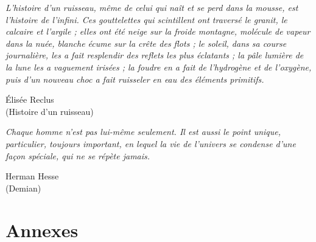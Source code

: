 \documentclass[a4paper,12pt,twoside]{StyleThese}
\begin{document}
\cleardoublepage
\vspace*{\fill} \epigraph{\itshape L’histoire d’un ruisseau, même de celui qui naît et se perd dans la mousse, est l’histoire de l’infini. Ces gouttelettes qui scintillent ont traversé le granit, le calcaire et l’argile ; elles ont été neige sur la froide montagne, molécule de vapeur dans la nuée, blanche écume sur la crête des flots ; le soleil, dans sa course journalière, les a fait resplendir des reflets les plus éclatants ; la pâle lumière de la lune les a vaguement irisées ; la foudre en a fait de l’hydrogène et de l’oxygène, puis d’un nouveau choc a fait ruisseler en eau des éléments primitifs.}{Élisée Reclus\\ (Histoire d'un ruisseau)}
\epigraph{\itshape Chaque homme n'est pas lui-même seulement. Il est aussi le point unique, particulier, toujours important, en lequel la vie de l'univers se condense d'une façon spéciale, qui ne se répète jamais.}{Herman Hesse \\ (Demian)}
\vfill\clearpage

\dominitoc
\tableofcontents

\adjustmtc
\listoffigures
\listoftables
\adjustmtc

\mainmatter


\cleardoublepage

\cleardoublepage

\cleardoublepage

\cleardoublepage

\cleardoublepage

\cleardoublepage

\appendix

\cleardoublepage
\mtcaddpart[Annexes]
\part*{Annexes}

\cleardoublepage

\cleardoublepage

\cleardoublepage

\cleardoublepage



\end{document}
